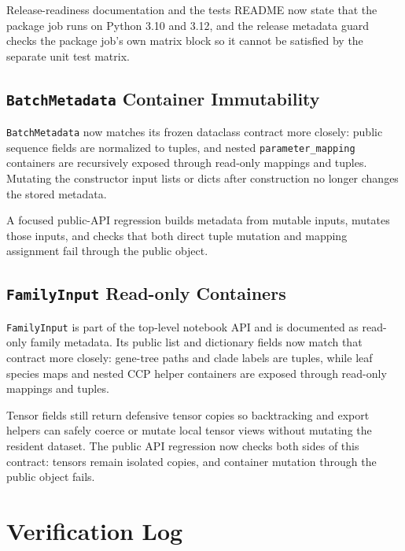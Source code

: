 \documentclass[11pt]{article}
\begin{document}
Release-readiness documentation and the tests README now state that the package
job runs on Python 3.10 and 3.12, and the release metadata guard checks the
package job's own matrix block so it cannot be satisfied by the separate unit
test matrix.

\subsection{\texttt{BatchMetadata} Container Immutability}

\texttt{BatchMetadata} now matches its frozen dataclass contract more closely:
public sequence fields are normalized to tuples, and nested
\texttt{parameter\_mapping} containers are recursively exposed through
read-only mappings and tuples.  Mutating the constructor input lists or dicts
after construction no longer changes the stored metadata.

A focused public-API regression builds metadata from mutable inputs, mutates
those inputs, and checks that both direct tuple mutation and mapping assignment
fail through the public object.

\subsection{\texttt{FamilyInput} Read-only Containers}

\texttt{FamilyInput} is part of the top-level notebook API and is documented as
read-only family metadata.  Its public list and dictionary fields now match that
contract more closely: gene-tree paths and clade labels are tuples, while leaf
species maps and nested CCP helper containers are exposed through read-only
mappings and tuples.

Tensor fields still return defensive tensor copies so backtracking and export
helpers can safely coerce or mutate local tensor views without mutating the
resident dataset.  The public API regression now checks both sides of this
contract: tensors remain isolated copies, and container mutation through the
public object fails.

\section{Verification Log}
\end{document}

